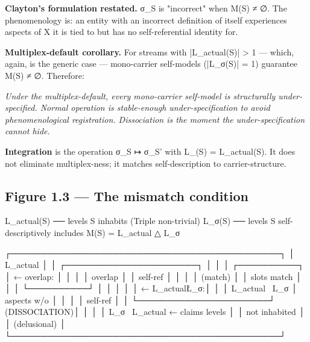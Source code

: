 \documentclass[11pt, openany]{book}
\renewenvironment{quote}{\begin{quoting}}{\end{quoting}}
\begin{document}
\textbf{Clayton's formulation restated.} σ\_\allowbreak{}S is "incorrect" when M(S) ≠ ∅. The phenomenology is: an entity with an incorrect definition of itself experiences aspects of X it is tied to but has no self-referential identity for.

\textbf{Multiplex-default corollary.} For streams with |L\_\allowbreak{}actual(S)| > 1 --- which, again, is the generic case --- mono-carrier self-models (|L\_\allowbreak{}σ(S)| = 1) guarantee M(S) ≠ ∅. Therefore:

\begin{quote}
\textit{Under the multiplex-default, every mono-carrier self-model is structurally under-specified. Normal operation is stable-enough under-specification to avoid phenomenological registration. Dissociation is the moment the under-specification cannot hide.}
\end{quote}

\textbf{Integration} is the operation σ\_\allowbreak{}S ↦ σ\_\allowbreak{}S' with L\_(S) = L\_\allowbreak{}actual(S). It does not eliminate multiplex-ness; it matches self-description to carrier-structure.

\subsection{Figure 1.3 --- The mismatch condition}

\begin{Code}
  L_actual(S)  ── levels S inhabits (Triple non-trivial)
  L_σ(S)       ── levels S self-descriptively includes
  M(S) = L_actual △ L_σ

  ┌─────────────────────────────────────────────┐
  │   L_actual                                  │
  │   ┌──────────────────────┐                  │
  │   │   ┌──────────┐       │   ← overlap:     │
  │   │   │  overlap │       │     self-ref     │
  │   │   │  (match) │       │     slots match  │
  │   │   └──────────┘       │                  │
  │   │                      │   ← L_actual\L_σ:│
  │   │   L_actual \ L_σ     │     aspects w/o  │
  │   │                      │     self-ref     │
  │   └──────────────────────┘     (DISSOCIATION)│
  │                                             │
  │   L_σ \ L_actual           ← claims levels  │
  │                              not inhabited  │
  │                              (delusional)   │
  └─────────────────────────────────────────────┘
\end{Code}
\end{document}
